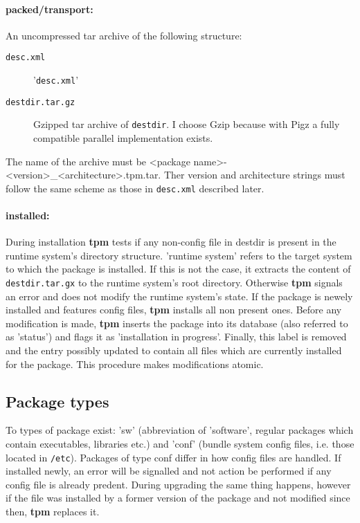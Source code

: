 \documentclass[a4paper]{article}
\newcommand{\file}[1]{\texttt{#1}}
\newcommand{\program}[1]{\textbf{#1}}
\begin{document}
	\paragraph{packed/transport:}
	An uncompressed tar archive of the following structure:
	\begin{description}
		\item[\file{desc.xml}] '\file{desc.xml}'
		
		\item[\file{destdir.tar.gz}] Gzipped tar archive of \file{destdir}. I choose Gzip because with Pigz a fully compatible parallel implementation exists.
	\end{description}
	The name of the archive must be <package name>-<version>\_<architecture>.tpm.tar. Ther version and architecture strings must follow the same scheme as those in \file{desc.xml} described later.
	
	\paragraph{installed:}
	During installation \program{tpm} tests if any non-config file in destdir is present in the runtime system's directory structure. 'runtime system' refers to the target system to which the package is installed. If this is not the case, it extracts the content of \file{destdir.tar.gx} to the runtime system's root directory. Otherwise \program{tpm} signals an error and does not modify the runtime system's state. If the package is newely installed and features config files, \program{tpm} installs all non present ones. Before any modification is made, \program{tpm} inserts the package into its database (also referred to as 'status') and flags it as 'installation in progress'. Finally, this label is removed and the entry possibly updated to contain all files which are currently installed for the package. This procedure makes modifications atomic.
	
	\subsection{Package types}
	\label{sec:package_types}
	
	To types of package exist: 'sw' (abbreviation of 'software', regular packages which contain executables, libraries etc.) and 'conf' (bundle system config files, i.e. those located in \file{/etc}). Packages of type conf differ in how config files are handled. If installed newly, an error will be signalled and not action be performed if any config file is already predent. During upgrading the same thing happens, however if the file was installed by a former version of the package and not modified since then, \program{tpm} replaces it.
	
\end{document}
